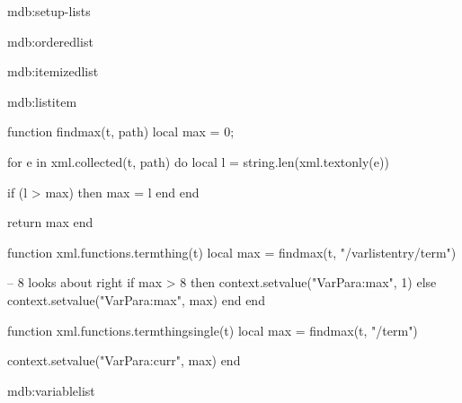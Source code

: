 %
%
%

\startxmlsetups mdb:setup-lists

\stopxmlsetups


\startxmlsetups mdb:orderedlist
	\startitemize[n]
	\stopitemize
\stopxmlsetups

\startxmlsetups mdb:itemizedlist
	\startitemize[1]
	\stopitemize
\stopxmlsetups

\startxmlsetups mdb:listitem
	\item
\stopxmlsetups

\startluacode

function findmax(t, path)
	local max = 0;

	for e in xml.collected(t, path) do
		local l = string.len(xml.textonly(e))

		if (l > max) then
			max = l
		end
	end

	return max
end

function xml.functions.termthing(t)
	local max = findmax(t, "/varlistentry/term")

	-- 8 looks about right
	if max > 8 then
		context.setvalue("VarPara:max", 1)
	else
		context.setvalue("VarPara:max", max)
	end
end

function xml.functions.termthingsingle(t)
	local max = findmax(t, "/term")

	context.setvalue("VarPara:curr", max)
end

\stopluacode

\startxmlsetups mdb:variablelist


	\setupparagraphs[VarPara][1][width=\getvalue{VarPara:max}ex]
	\setupparagraphs[VarPara][2][width=]


